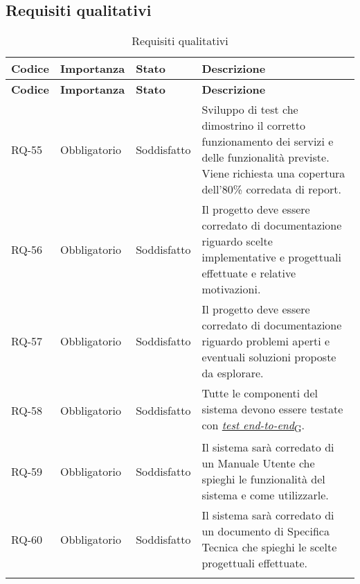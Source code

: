 \subsection{Requisiti qualitativi}
\begin{longtable}{|>{\centering\arraybackslash}m{}|>{\centering\arraybackslash}m{}|>{\centering\arraybackslash}m{}|>{\centering\arraybackslash}m{}|}
	\hline
	\textbf{Codice} & \textbf{Importanza} & \textbf{Stato}& \textbf{Descrizione}\\\hline
	\endfirsthead
	\hline
	\textbf{Codice} & \textbf{Importanza} & \textbf{Stato}& \textbf{Descrizione}\\\hline
	\endhead
	\hline
	RQ-55           & Obbligatorio        & Soddisfatto & Sviluppo di test che dimostrino il corretto funzionamento dei servizi e delle funzionalità previste. Viene richiesta una copertura dell'80\% corredata di report.
	\\\hline
	RQ-56           & Obbligatorio        & Soddisfatto & Il progetto deve essere corredato di documentazione riguardo scelte implementative e progettuali effettuate e relative motivazioni.
	\\\hline
	RQ-57           & Obbligatorio        & Soddisfatto & Il progetto deve essere corredato di documentazione riguardo problemi aperti e eventuali soluzioni proposte da esplorare.
	\\\hline
	RQ-58           & Obbligatorio        & Soddisfatto & Tutte le componenti del sistema devono essere testate con \href{https://7last.github.io/docs/pb/documentazione-interna/glossario\#test-end-to-end}{\textit{test end-to-end}\textsubscript{G}}.
	\\\hline
	RQ-59           & Obbligatorio        & Soddisfatto                                                                                                                                                                                                                                              & Il sistema sarà corredato di un Manuale Utente che spieghi le funzionalità del sistema e come utilizzarle.
	\\\hline
	RQ-60           & Obbligatorio        & Soddisfatto                                                                                                                                                                                                                                              & Il sistema sarà corredato di un documento di Specifica Tecnica che spieghi le scelte progettuali effettuate.
	\\\hline
	\caption{Requisiti qualitativi}
\end{longtable}

